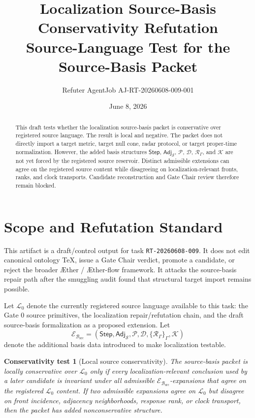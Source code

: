 \documentclass[11pt]{article}
\title{\textbf{Localization Source-Basis Conservativity Refutation}\\[0.35em]
\large Source-Language Test for the Source-Basis Packet}
\author{Refuter AgentJob AJ-RT-20260608-009-001}
\date{June 8, 2026}
\newcommand{\Aether}{\AE{}ther}
\newcommand{\Aflow}{\AE{}ther-flow}
\newcommand{\TheoryProgram}{\Aether{} / \Aflow{} framework}
\newcommand{\Step}{\mathsf{Step}}
\newcommand{\Adj}{\mathsf{Adj}_{\mathcal{S}}}
\newcommand{\RespAlg}{\mathcal{R}_{\Gamma}}
\newcommand{\Basis}{\mathcal{B}_{\mathrm{src}}}
\newcommand{\Lang}{\mathcal{L}_{0}}
\newcommand{\Ext}{\mathcal{E}_{\Basis}}
\newtheorem{test}{Conservativity test}
\begin{document}
\maketitle

\begin{abstract}
This draft tests whether the localization source-basis packet is conservative
over registered source language. The result is local and negative. The packet
does not directly import a target metric, target null cone, radar protocol, or
target proper-time normalization. However, the added basis structures
\(\Step\), \(\Adj\), \(\mathcal{P}\), \(\mathcal{D}\), \(\RespAlg\), and
\(\mathcal{K}\) are not yet forced by the registered source reservoir. Distinct
admissible extensions can agree on the registered source content while
disagreeing on localization-relevant fronts, ranks, and clock transports.
Candidate reconstruction and Gate Chair review therefore remain blocked.
\end{abstract}

\section{Scope and Refutation Standard}

This artifact is a draft/control output for task \texttt{RT-20260608-009}. It
does not edit canonical ontology TeX, issue a Gate Chair verdict, promote a
candidate, or reject the broader \TheoryProgram{}. It attacks the source-basis
repair path after the smuggling audit found that structural target import
remains possible.

Let \(\Lang\) denote the currently registered source language available to this
task: the Gate 0 source primitives, the localization repair/refutation chain,
and the draft source-basis formalization as a proposed extension. Let
\[
\Ext =
(\Step,\Adj,\mathcal{P},\mathcal{D},\{\RespAlg\}_{\Gamma},\mathcal{K})
\]
denote the additional basis data introduced to make localization testable.

\begin{test}[Local source conservativity]
The source-basis packet is locally conservative over \(\Lang\) only if every
localization-relevant conclusion used by a later candidate is invariant under
all admissible \(\Ext\)-expansions that agree on the registered \(\Lang\)
content. If two admissible expansions agree on \(\Lang\) but disagree on
front incidence, adjacency neighborhoods, response rank, or clock transport,
then the packet has added nonconservative structure.
\end{test}
\end{document}
